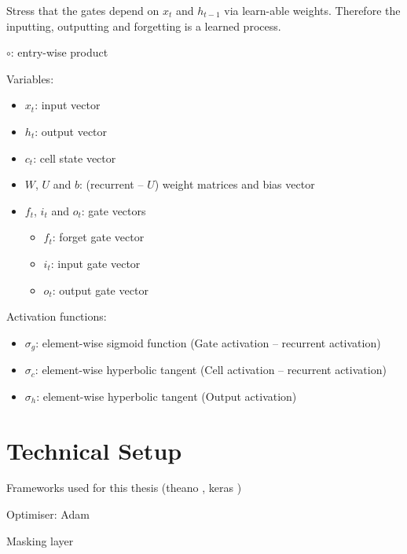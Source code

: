 Stress that the gates depend on $x_t$ and $h_{t-1}$ via learn-able weights.
Therefore the inputting, outputting and forgetting is a learned process.

$\circ$: entry-wise product


Variables:
\begin{itemize}
\item $x_t$: input vector
\item $h_t$: output vector
\item $c_t$: cell state vector
\item $W$, $U$ and $b$: (recurrent -- $U$) weight matrices and bias vector
\item $f_t$, $i_t$ and $o_t$: gate vectors
  \begin{itemize}
  \item $f_t$: forget gate vector
  \item $i_t$: input gate vector
  \item $o_t$: output gate vector
  \end{itemize}
\end{itemize}

Activation functions:
\begin{itemize}
\item $\sigma_g$: element-wise sigmoid function (Gate activation -- recurrent
  activation)
\item $\sigma_c$: element-wise hyperbolic tangent (Cell activation -- recurrent
  activation)
\item $\sigma_h$: element-wise hyperbolic tangent (Output activation)
\end{itemize}


\section{Technical Setup}
\label{sec:tech_setup}

Frameworks used for this thesis (theano \cite{theano}, keras \cite{keras})

Optimiser: Adam

Masking layer


